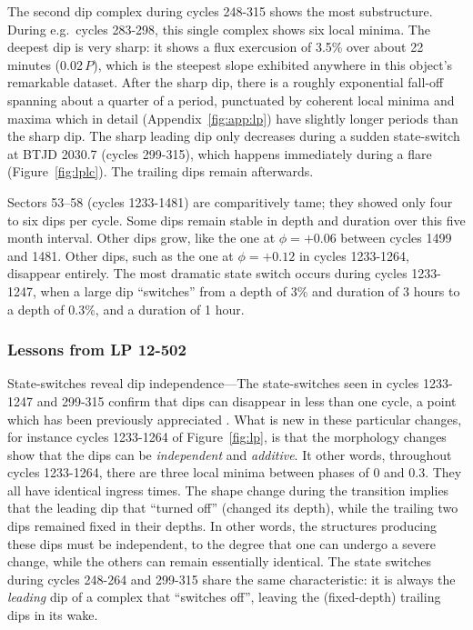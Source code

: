 \documentclass[11pt,twocolumn,tighten]{aastex63}
\begin{document}
The second dip complex during cycles 248-315 shows the most
substructure.  During e.g.~cycles 283-298, this single complex shows
six local minima.  The deepest dip is very sharp: it shows a flux
exercusion of 3.5\% over about 22 minutes (0.02\,$P$), which is the
steepest slope exhibited anywhere in this object's remarkable dataset.
After the sharp dip, there is a roughly exponential fall-off spanning
about a quarter of a period, punctuated by coherent local minima and
maxima which in detail (Appendix~\ref{fig:app:lp}) have slightly
longer periods than the sharp dip.  The sharp leading dip only
decreases during a sudden state-switch at BTJD 2030.7 (cycles
299-315), which happens immediately during a flare
(Figure~\ref{fig:lplc}).  The trailing dips remain afterwards.

Sectors 53--58 (cycles 1233-1481) are comparitively tame; they showed
only four to six dips per cycle.  Some dips remain stable in depth and
duration over this five month interval.  Other dips grow, like the one
at $\phi = +0.06$ between cycles 1499 and 1481.  Other dips, such as
the one at $\phi = +0.12$ in cycles 1233-1264, disappear entirely.
The most dramatic state switch occurs during cycles 1233-1247, when a
large dip ``switches'' from a depth of 3\% and duration of 3 hours to
a depth of 0.3\%, and a duration of 1 hour.


\subsubsection{Lessons from LP 12-502}

{\sc State-switches reveal dip independence}---The state-switches seen
in cycles 1233-1247 and 299-315 confirm that dips can disappear in
less than one cycle, a point which has been previously appreciated
\citep{2017AJ....153..152S}.  What is new in these particular changes,
for instance cycles 1233-1264 of Figure~\ref{fig:lp}, is that the
morphology changes show that the dips can be {\it independent} and
{\it additive}.  It other words, throughout cycles 1233-1264, there
are three local minima between phases of 0 and 0.3.  They all have
identical ingress times.  The shape change during the transition
implies that the leading dip that ``turned off'' (changed its depth),
while the trailing two dips remained fixed in their depths.  In other
words, the structures producing these dips must be independent, to the
degree that one can undergo a severe change, while the others can
remain essentially identical.  The state switches during cycles
248-264 and 299-315 share the same characteristic: it is always the
{\it leading} dip of a complex that ``switches off'', leaving the
(fixed-depth) trailing dips in its wake.
\end{document}
